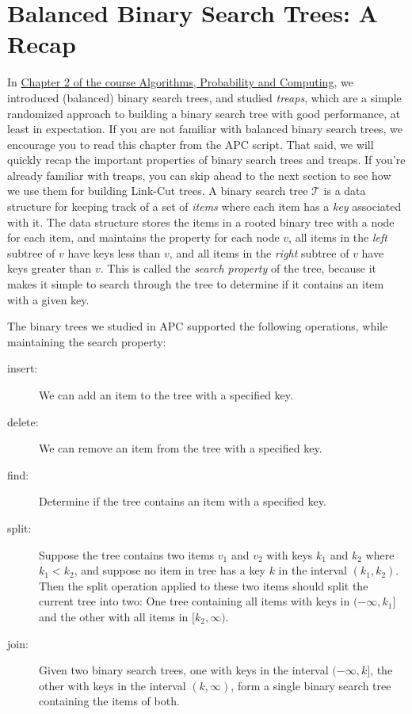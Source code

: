 \section{Balanced Binary Search Trees: A Recap}
In \href{https://ti.inf.ethz.ch/ew/courses/APC21/Chapter_2.pdf}{Chapter 2 of the course Algorithms, Probability and Computing}, we introduced (balanced) binary search trees, and studied \emph{treaps}, which are a simple randomized approach to building a binary search tree with good performance, at least in expectation.
If you are not familiar with balanced binary search trees, we encourage you to read this chapter from the APC script. 
That said, we will quickly recap the important properties of binary search trees and treaps.
If you're already familiar with treaps, you can skip ahead to the next section to see how we use them for building Link-Cut trees.
%
A binary search tree $\mathcal{T}$ is a data structure for keeping track of a set of \emph{items} where each item has a \emph{key} associated with it.
The data structure stores the items in a rooted binary tree with a node for each item, and maintains the property for each node $v$, all items in the \emph{left} subtree of $v$ have keys less than $v$, and all items in the \emph{right} subtree of $v$ have keys greater than $v$.
This is called the \emph{search property} of the tree, because it makes it simple to search through the tree to determine if it contains an item with a given key.

The binary trees we studied in APC supported the following operations, while maintaining the search property:
\begin{description}
\item[insert:] We can add an item to the tree with a specified key.
\item[delete:] We can remove an item from the tree with a specified key.
\item[find:] Determine if the tree contains an item with a specified key.
\item[split:] Suppose the tree contains two items $v_1$ and $v_2$ with keys $k_1$ and $k_2$ where $k_1 < k_2$, and suppose no item in tree has a key $k$ in the interval $(k_1,k_2)$. Then the split operation applied to these two items should split the current tree into two: One tree containing all items with keys in $(-\infty,k_1]$ and the other with all items in $[k_2,\infty)$.
\item[join:] Given two binary search trees, one with keys in the interval $(-\infty,k]$, the other with keys in the interval $(k,\infty)$, form a single binary search tree containing the items of both.
\end{description}

